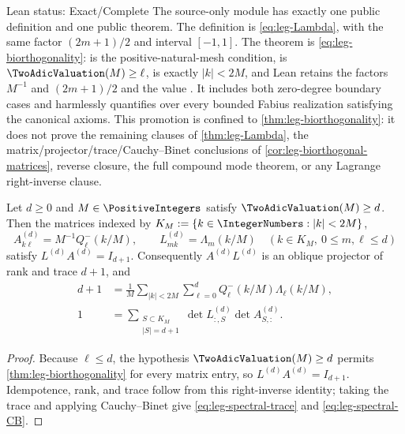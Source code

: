 \begin{statusbox}{Lean status: Exact/Complete}
The source-only module
 has exactly one public
definition and one public theorem.  The definition
 is \eqref{eq:leg-Lambda}, with the same
factor $(2m+1)/2$ and interval $[-1,1]$.  The theorem
 is \eqref{eq:leg-biorthogonality}:
 is the positive-natural-mesh condition,
 is $\TwoAdicValuation(M)\ge\ell$,
 is exactly $\lvert k\rvert<2M$, and Lean
retains the factors $M^{-1}$ and $(2m+1)/2$ and the value
.  It includes both zero-degree boundary cases
and harmlessly quantifies over every bounded Fabius realization satisfying
the canonical axioms.  This promotion is confined to
\cref{thm:leg-biorthogonality}: it does not prove the remaining clauses of
\cref{thm:leg-Lambda}, the matrix/projector/trace/Cauchy--Binet conclusions of
\cref{cor:leg-biorthogonal-matrices}, reverse closure, the full compound mode
theorem, or any Lagrange right-inverse clause.
\end{statusbox}

\begin{corollary}
\label{cor:leg-biorthogonal-matrices}
Let $d\ge0$ and $M\in\PositiveIntegers$ satisfy $\TwoAdicValuation(M)\ge d$.  Then the matrices
indexed by $K_M:=\{k\in\IntegerNumbers:|k|<2M\}$,
\[
 A_{k\ell}^{(d)}=M^{-1}Q_\ell^-(k/M),\qquad
 L_{mk}^{(d)}=\Lambda_m(k/M)
 \quad(k\in K_M,\ 0\le m,\ell\le d)
\]
satisfy $L^{(d)}A^{(d)}=I_{d+1}$.  Consequently
$A^{(d)}L^{(d)}$ is an oblique projector of rank and trace $d+1$, and
\begin{align}
 d+1&=\frac1M\sum_{|k|<2M}\sum_{\ell=0}^{d}
 Q_\ell^-(k/M)\Lambda_\ell(k/M),
 \label{eq:leg-spectral-trace}\\
 1&=\sum_{\substack{S\subset K_M\\|S|=d+1}}
 \det L^{(d)}_{:,S}\det A^{(d)}_{S,:}.
 \label{eq:leg-spectral-CB}
\end{align}
\end{corollary}

\begin{proof}
Because $\ell\le d$, the hypothesis $\TwoAdicValuation(M)\ge d$ permits
\cref{thm:leg-biorthogonality} for every matrix entry, so
$L^{(d)}A^{(d)}=I_{d+1}$.  Idempotence, rank, and trace follow from this
right-inverse identity;
taking the trace and applying Cauchy--Binet give
\eqref{eq:leg-spectral-trace} and \eqref{eq:leg-spectral-CB}.
\end{proof}

\LegendreDeferredClosure
